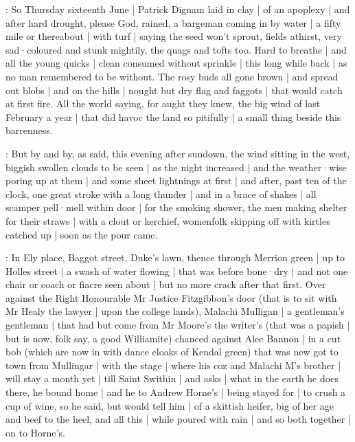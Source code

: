 

:
So Thursday sixteenth June |
Patrick Dignam laid in clay |
of an apoplexy |
and after hard drought,
please God,
rained,
a bargeman coming in by water |
a fifty mile or thereabout |
with turf |
saying the seed won't sprout,
fields athirst,
very sad·coloured and stunk mightily,
the quags and tofts too.
Hard to breathe |
and all the young quicks |
clean consumed without sprinkle |
this long while back |
as no man remembered to be without.
The rosy buds all gone brown |
and spread out blobs |
and on the hills |
nought but dry flag and faggots |
that would catch at first fire.
All the world saying,
for aught they knew,
the big wind of last February a year |
that did havoc the land so pitifully |
a small thing beside this barrenness.

:
But by and by,
as said,
this evening after sundown,
the wind sitting in the west,
biggish swollen clouds to be seen |
as the night increased |
and the weather·wise poring up at them |
and some sheet lightnings at first |
and after,
past ten of the clock,
one great stroke with a long thunder |
and in a brace of shakes |
all scamper pell·mell within door |
for the smoking shower,
the men making shelter for their straws |
with a clout or kerchief,
womenfolk skipping off with kirtles catched up |
soon as the pour came.

:
In Ely place,
Baggot street,
Duke's lawn,
thence through Merrion green |
up to Holles street |
a swash of water flowing |
that was before bone·dry |
and not one chair or coach or fiacre seen about |
but no more crack after that first.
Over against the Right Honourable Mr Justice Fitzgibbon's door
(that is to sit with Mr Healy the lawyer |
upon the college lands),
Malachi Mulligan |
a gentleman's gentleman |
that had but come from Mr Moore's the writer's
(that was a papish |
but is now,
folk say,
a good Williamite)
chanced against Alec Bannon |
in a cut bob
(which are now in with dance cloaks of Kendal green)
that was new got to town from Mullingar |
with the stage |
where his coz and Malachi M's brother |
will stay a month yet |
till Saint Swithin |
and asks |
what in the earth he does there,
he bound home |
and he to Andrew Horne's |
being stayed for |
to crush a cup of wine,
so he said,
but would tell him |
of a skittish heifer,
big of her age and beef to the heel,
and all this |
while poured with rain |
and so both together |
on to Horne's.

